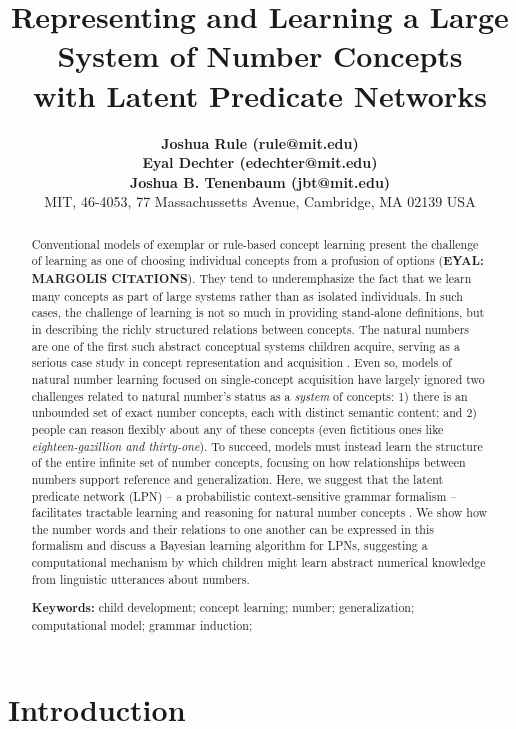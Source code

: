 \documentclass[10pt,letterpaper]{article}
\title{Representing and Learning a Large System of Number Concepts \\ with Latent Predicate Networks}
\author{
  {\large \bf Joshua Rule (rule@mit.edu)}\\
  {\large \bf Eyal Dechter (edechter@mit.edu)}\\
  {\large \bf Joshua B. Tenenbaum (jbt@mit.edu)}\\
  MIT, 46-4053, 77 Massachussetts Avenue, Cambridge, MA 02139 USA}
\begin{document}
\maketitle

\begin{abstract}
  Conventional models of exemplar or rule-based concept learning
  present the challenge of learning as one of choosing individual
  concepts from a profusion of options ({\bf EYAL: MARGOLIS
    CITATIONS}). They tend to underemphasize the fact that we learn
  many concepts as part of large systems rather than as isolated
  individuals. In such cases, the challenge of learning is not so much
  in providing stand-alone definitions, but in describing the richly
  structured relations between concepts. The natural numbers are one
  of the first such abstract conceptual systems children acquire,
  serving as a serious case study in concept representation and
  acquisition \citep{fuson1988children,galGel2005,Car2009}. Even so,
  models of natural number learning focused on single-concept
  acquisition have largely ignored two challenges related to natural
  number's status as a \emph{system} of concepts: 1) there is an
  unbounded set of exact number concepts, each with distinct semantic
  content; and 2) people can reason flexibly about any of these
  concepts (even fictitious ones like \emph{eighteen-gazillion and
    thirty-one}). To succeed, models must instead learn the structure
  of the entire infinite set of number concepts, focusing on how
  relationships between numbers support reference and generalization.
  Here, we suggest that the latent predicate network (LPN) -- a
  probabilistic context-sensitive grammar formalism -- facilitates
  tractable learning and reasoning for natural number concepts
  \citep{DecRulTen2015}. We show how the number words and their
  relations to one another can be expressed in this formalism and
  discuss a Bayesian learning algorithm for LPNs, suggesting a
  computational mechanism by which children might learn abstract
  numerical knowledge from linguistic utterances about numbers.

  \textbf{Keywords:}
  child development; concept learning; number; generalization;
  computational model; grammar induction;
\end{abstract}

\section{Introduction}
\end{document}
